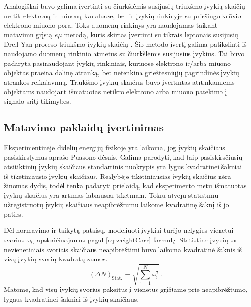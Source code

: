 \documentclass[a4paper, 12pt, oneside]{article}
\newcommand{\emu}{e\mu}
\newlength\q
\begin{document}
Analogiškai buvo galima įvertinti su čiurkšlėmis susijusių triukšmo įvykių skaičių ne tik elektronų
ir miuonų kanaluose, bet ir įvykių rinkinyje su priešingo krūvio elektrono-miuono pora.
Toks duomenų rinkinys yra naudojamas taikant matavimu grįstą $\emu$ metodą, kuris skirtas įvertinti su tikrais leptonais susijusių
Drell-Yan proceso triukšmo įvykių skaičių \cite{MAbak}.
Šio metodo įvertį galima patikslinti iš naudojamo duomenų rinkinio atmetus su čiurkšlėmis susijusius įvykius.
Tai buvo padaryta pasinaudojant įvykių rinkiniais, kuriuose elektrono ir/arba miuono objektas praeina dalinę atranką, bet netenkina
griežtesniųjų pagrindinės įvykių atrankos reikalavimų.
Triukšmo įvykių skaičius buvo įvertintas atitinkamiems objektams naudojant išmatuotas netikro elektrono arba miuono patekimo į
signalo sritį tikimybes.


\subsection{Matavimo paklaidų įvertinimas}\label{sec:uncertainties}
Eksperimentinėje didelių energijų fizikoje yra laikoma, jog įvykių skaičiaus pasiskirstymus aprašo Puasono dėsnis.
Galima parodyti, kad taip pasiskirsčiusių atsitiktinių įvykių skaičiaus standartinis nuokrypis yra lygus kvadratinei
šakniai iš tikėtiniausio įvykių skaičiaus.
Realybėje tikėtiniausias įvykių skaičius nėra žinomas dydis, todėl tenka padaryti prielaidą, kad eksperimento metu išmatuotas
įvykių skaičius yra artimas labiausiai tikėtinam.
Tokiu atveju statistiniu užregistruotų įvykių skaičiaus neapibrėžtumu laikome kvadratinę šaknį iš jo paties.

Dėl normavimo ir taikytų pataisų, modeliuoti įvykiai turėjo nelygius vienetui svorius $\omega_i$, apskaičiuojamus pagal
\eqref{eq:weightCorr} formulę.
Statistine įvykių su nevienetiniais svoriais skaičiaus neapibrėžtimi buvo laikoma kvadratinė šaknis iš visų įvykių svorių
kvadratų sumos:
\begin{equation}
	(\Delta N)_{\mathrm{Stat.\,}} = \sqrt{\sum_{i=1}^{N}\omega_{i}^{2}} \; .
	\label{eq:Sumw2Unc}
\end{equation}
Matome, kad visų įvykių svorius pakeitus į vienetus grįžtame prie neapibrėžtumo, lygaus kvadratinei šakniai iš įvykių
skaičiaus.
\end{document}
